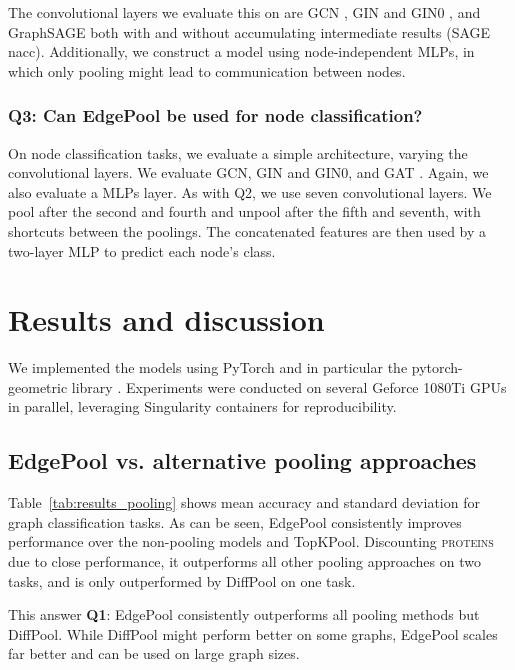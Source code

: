 \documentclass{article}
\newcommand{\tableref}[1]{Table~\ref{#1}}
\newcommand{\edgepool}{EdgePool}
\newcommand{\datasetname}[1]{\textsc{#1}}
\newcommand{\proteins}{\datasetname{proteins}}
\begin{document}
The convolutional layers we evaluate this on are GCN \citep{kipf_semi-supervised_2016}, GIN and GIN0 \citep{xu2018how}, and GraphSAGE \citep{hamiltonInductiveRepresentationLearning2017} both with and without accumulating intermediate results (SAGE nacc). Additionally, we construct a model using node-independent \glspl{MLP}, in which only pooling might lead to communication between nodes.


\subsubsection{Q3: Can \edgepool{} be used for node classification?}
On node classification tasks, we evaluate a simple architecture, varying the convolutional layers. We evaluate GCN, GIN and GIN0, and GAT \citep{velickovicGraphAttentionNetworks2017}. Again, we also evaluate a \glspl{MLP} layer. As with Q2, we use seven convolutional layers. We pool after the second and fourth and unpool after the fifth and seventh, with shortcuts between the poolings. The concatenated features are then used by a two-layer MLP to predict each node's class.

 
\section{Results and discussion}

We implemented the models using PyTorch \citep{paszke2017automatic} and in particular the pytorch-geometric library \citep{feyFastGraphRepresentation2019}. Experiments were conducted on several Geforce 1080Ti GPUs in parallel, leveraging Singularity containers \citep{Kurtzer2017} for reproducibility.

\subsection{\edgepool{} vs. alternative pooling approaches}

\tableref{tab:results_pooling} shows mean accuracy and standard deviation for graph classification tasks. As can be seen, \edgepool{} consistently improves performance over the non-pooling models and TopKPool. Discounting \proteins{} due to close performance, it outperforms all other pooling approaches on two tasks, and is only outperformed by DiffPool on one task.

This answer \textbf{Q1}: \edgepool{} consistently outperforms all pooling methods but DiffPool. While DiffPool might perform better on some graphs, \edgepool{} scales far better and can be used on large graph sizes.
\end{document}
